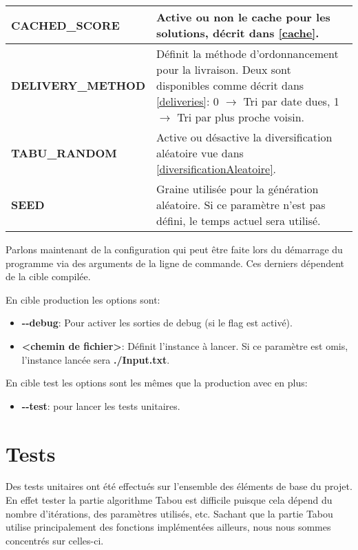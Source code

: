 \documentclass[hideweeklyreports]{polytech/polytech}
\begin{document}
\begin{centering}
\begin{tabularx}{\textwidth}{|l|X|}
						\textbf{CACHED\_SCORE} & Active ou non le cache pour les solutions, décrit dans \autoref{cache}.\\\hline
						\textbf{DELIVERY\_METHOD} & Définit la méthode d'ordonnancement pour la livraison. Deux sont disponibles comme décrit dans \autoref{deliveries}:
							0 $\rightarrow$ Tri par date dues, 
							1 $\rightarrow$ Tri par plus proche voisin.
							\\\hline
						\textbf{TABU\_RANDOM} & Active ou désactive la diversification aléatoire vue dans \autoref{diversificationAleatoire}.\\\hline
						\textbf{SEED} & Graine utilisée pour la génération aléatoire. Si ce paramètre n'est pas défini, le temps actuel sera utilisé.\\\hline
					\end{tabularx}
				\end{centering}
				
				Parlons maintenant de la configuration qui peut être faite lors du démarrage du programme via des arguments de la ligne de commande. Ces derniers dépendent de la cible compilée.
				
				En cible production les options sont:
				\begin{itemize}
					\item \textbf{-{}-debug}: Pour activer les sorties de debug (si le flag est activé).
					\item \textbf{<chemin de fichier>}: Définit l'instance à lancer. Si ce paramètre est omis, l'instance lancée sera \textbf{./Input.txt}.
				\end{itemize}
				
				En cible test les options sont les mêmes que la production avec en plus:
				\begin{itemize}
					\item \textbf{-{}-test}: pour lancer les tests unitaires.
				\end{itemize}
		
		\section{\label{unit}Tests}
			Des tests unitaires ont été effectués sur l'ensemble des éléments de base du projet. En effet tester la partie algorithme Tabou est difficile puisque cela dépend du nombre d'itérations, des paramètres utilisés, etc. Sachant que la partie Tabou utilise principalement des fonctions implémentées ailleurs, nous nous sommes concentrés sur celles-ci.
			
\end{document}
